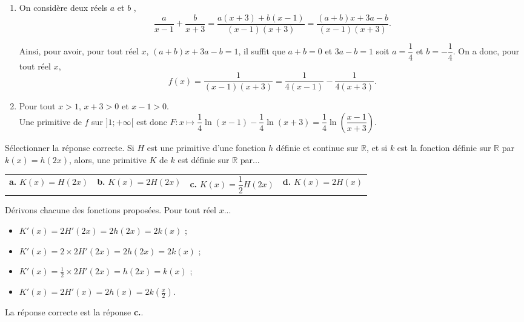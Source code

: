 \documentclass[11pt,fleqn, openany]{book} %
\begin{document}
\begin{solution} \hspace{0pt}

\begin{enumerate}\item  On considère deux réels \(a\) et \(b\) ,
\[\dfrac{a}{x-1}+\dfrac{b}{x+3}=\dfrac{a(x+3)+b(x-1)}{(x-1)(x+3)}=\dfrac{(a+b)x+3a-b}{(x-1)(x+3)}.\]

Ainsi, pour avoir, pour tout réel \(x\), \((a+b)x+3a-b=1\), il suffit que \(a+b=0\) et \(3a-b=1\) soit \(a=\dfrac{1}{4}\) et \(b=-\dfrac{1}{4}\). On a donc, pour tout réel \(x\), 
\[f(x)=\dfrac{1}{(x-1)(x+3)}=\dfrac{1}{4(x-1)}-\dfrac{1}{4(x+3)}.\]

\item  Pour tout \(x>1\), \(x+3>0\) et \(x-1>0\). \\

Une primitive de \(f\) sur \(]1;+\infty[\) est donc \(F:x\mapsto \dfrac{1}{4}\ln(x-1)-\dfrac{1}{4}\ln(x+3)=\dfrac{1}{4}\ln\left(\dfrac{x-1}{x+3}\right)\).\end{enumerate}
\end{solution}



\begin{exercise}[topic=diff02, subtitle={(Polynésie 2022)}]Sélectionner la réponse correcte. Si $H$ est une primitive d'une fonction $h$ définie et continue sur $\mathbb{R}$, et si $k$ est la fonction définie sur $\mathbb{R}$ par $k(x)=h(2x)$, alors, une primitive $K$ de $k$ est définie sur $\mathbb{R}$ par...

\begin{tabularx}{\linewidth}{XXXX}
\textbf{a.} $K(x)=H(2x)$ & \textbf{b.} $K(x)=2H(2x)$ & \textbf{c.} $K(x)=\dfrac{1}{2}H(2x)$ & \textbf{d.} $K(x)=2H(x)$\end{tabularx}\vspace{-0.5cm}\end{exercise}



\begin{solution}
Dérivons chacune des fonctions proposées. Pour tout réel $x$...
\begin{itemize}
\item $K'(x)=2H'(2x)=2h(2x)=2k(x)$ ;
\item $K'(x)=2 \times 2H'(2x)=2h(2x)=2k(x)$ ;
\item $K'(x)=\frac{1}{2} \times 2H'(2x)=h(2x)=k(x)$ ;
\item $K'(x)=2H'(x)=2h(x)=2k\left(\frac{x}{2}\right)$.\end{itemize}
La réponse correcte est la réponse\textbf{ c.}.\end{solution}
\end{document}
